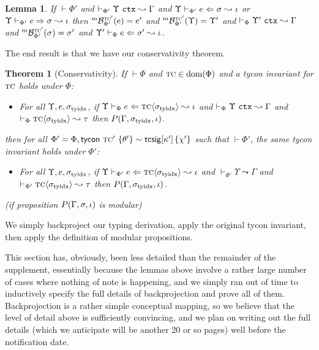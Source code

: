 \documentclass[12pt]{article}
\newtheorem{theorem}{Theorem}
\newtheorem{lemma}{Lemma}
\newenvironment{proof-sketch}{\noindent{\emph{Proof Sketch.}}}{\qed}
\begin{document}
\begin{lemma}
If $\vdash \Phi'$ and $\vdash_{\Phi'} \Upsilon~\mathtt{ctx} \leadsto \Gamma$ and $\Upsilon \vdash_{\Phi'} e \Leftarrow \sigma \leadsto \iota$ or $\Upsilon \vdash_{\Phi'} e \Rightarrow \sigma \leadsto \iota$ then ${}^{m}\mathcal{B}_{\Phi'}^{\textsc{tc}'}(e)=e'$ and ${}^{m}\mathcal{B}_{\Phi'}^{\textsc{tc}'}(\Upsilon)=\Upsilon'$ and $\vdash_{\Phi} \Upsilon'~\mathtt{ctx} \leadsto \Gamma$ and ${}^{m}\mathcal{B}_{\Phi'}^{\textsc{tc}'}(\sigma)=\sigma'$ and $\Upsilon' \vdash_{\Phi} e \Leftarrow \sigma' \leadsto \iota$.
\end{lemma}

The end result is that we have our conservativity theorem.

\begin{theorem}[Conservativity]\label{thm:conservativity} If $\vdash \Phi$ and $\textsc{tc} \in \text{dom}(\Phi)$ and a tycon invariant for $\textsc{tc}$ holds under $\Phi$: \begin{itemize}
\item For all $\Upsilon, e, \sigma_\text{tyidx}$, if $\Upsilon \vdash_{\Phi} e \Leftarrow {\textsc{tc}}\langle\sigma_\text{tyidx}\rangle \leadsto \iota$ and $\vdash_{\Phi} \Upsilon~\mathtt{ctx} \leadsto \Gamma$ and $\vdash_\Phi {{\textsc{tc}}\langle\sigma_\text{tyidx}\rangle} \leadsto \tau$  then $P(\Gamma, \sigma_\text{tyidx}, \iota)$.
\end{itemize} then for all $\Phi' = \Phi, {\sf tycon}~\textsc{tc}' ~\{\theta'\} \sim {\sf tcsig}[\kappa']\,\{\chi'\}$ such that $\vdash \Phi'$, the same tycon invariant holds under $\Phi'$: \begin{itemize}
\item For all $\Upsilon, e, \sigma_\text{tyidx}$, if $\Upsilon \vdash_{\Phi'} e \Leftarrow {\textsc{tc}}\langle\sigma_\text{tyidx}\rangle \leadsto \iota$ and $\vdash_{\Phi'} \Upsilon \leadsto \Gamma$ and $\vdash_{\Phi'}{{\textsc{tc}}\langle\sigma_\text{tyidx}\rangle}\leadsto{\tau}$ then $P(\Gamma, \sigma_\text{tyidx}, \iota)$.
\end{itemize}
(if proposition $P(\Gamma, \sigma, \iota)$ is \emph{modular})
\end{theorem}
\begin{proof-sketch}
We simply backproject our typing derivation, apply the original tycon invariant, then apply the definition of modular propositions.\end{proof-sketch}

This section has, obviously, been less detailed than the remainder of the supplement, essentially because the lemmas above involve a rather large number of cases where nothing of note is happening, and we simply ran out of time to inductively specify the full details of backprojection and prove all of them. Backprojection is a rather simple conceptual mapping, so we believe that the level of detail above is sufficiently convincing, and we plan on writing out the full details (which we anticipate will be another 20 or so pages) well before the notification date.
\end{document}
